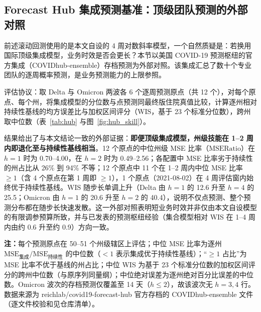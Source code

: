 \documentclass[11pt,a4paper]{article}
\theoremstyle{plain}
\theoremstyle{definition}
\begin{document}
\subsection{Forecast Hub 集成预测基准：顶级团队预测的外部对照}\label{sec:hub}

前述滚动回测使用的是本文自设的 4 周对数斜率模型，一个自然质疑是：若换用国际顶级集成模型，业务时效是否会更长？本节以美国 COVID-19 预测枢纽的官方集成（COVIDhub-ensemble）存档预测为外部对照。该集成汇总了数十个专业团队的逐周概率预测，是业务预测能力的上限参照。

评估协议：取 Delta 与 Omicron 两波各 6 个逐周预测原点（共 12 个），对每个原点、每个州，将集成模型的分位数与点预测同最终版住院真值比较，计算逐州相对持续性基线的均方误差比与加权区间评分（WIS，基于 23 个标准分位数），跨州取中位数（表~\ref{tab:hub} 与图~\ref{fig:hub_skill}）。

结果给出了与本文结论一致的外部证据：\textbf{即便顶级集成模型，州级技能在 1--2 周内即退化至与持续性基线相当}。12 个原点的中位州级 MSE 比率（$\text{MSERatio}$）在 $h=1$ 时为 0.70--4.00，在 $h=2$ 时为 0.49--2.56；各配置中 MSE 比率劣于持续性的州占比从 26\% 到 94\% 不等；12 个原点中 11 个在 1--2 周内中位 MSE 比率 $\ge 1$（含 4 个原点在第 1 周即 $\ge 1$），1 个原点（2021-08-02）在 4 周评估窗内始终优于持续性基线。WIS 随步长单调上升（Delta 由 $h=1$ 的 12.6 升至 $h=4$ 的 25.5；Omicron 由 $h=1$ 的 20.6 升至 $h=2$ 的 40.4），说明不仅点预测、整个预测分布都在随步长快速发散。这一外部对照表明短业务时效并非仅由本文自设模型的有限调参预算所致，并与已发表的预测枢纽经验（集合模型相对 WIS 在 1--4 周内由约 0.6 升至约 0.9）方向一致。

\begin{table}[htbp]
\centering
\footnotesize
\caption{COVIDhub-ensemble 集成预测的州级技能衰减（12 个预测原点）}
\label{tab:hub}
\resizebox{\textwidth}{!}{%
%
}
\vspace{2pt}
\begin{flushleft}
\scriptsize \textbf{注：}每个预测原点在 50--51 个州级辖区上评估；中位 MSE 比率为逐州 $\text{MSE}_{\text{集成}}/\text{MSE}_{\text{持续性}}$ 的中位数（$<1$ 表示集成优于持续性基线）；``$\ge 1$ 占比''为 MSE 比率不优于基线的州占比；中位 WIS 为基于 23 个标准分位数的加权区间评分的跨州中位数（与原序列同量纲）；中位绝对误差为逐州绝对百分比误差的中位数。Omicron 波次的存档预测仅覆盖至 14 天（$h\le 2$），故该波次无 $h=3,4$ 行。数据来源为 reichlab/covid19-forecast-hub 官方存档的 COVIDhub-ensemble 文件（逐文件校验和见仓库清单）。\end{flushleft}
\end{table}
\end{document}
